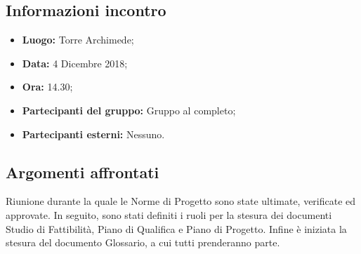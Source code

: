 \subsection{Informazioni incontro}
\begin{itemize}
	\item { \textbf{Luogo:} Torre Archimede;  }
	\item { \textbf{Data:} 4 Dicembre 2018; }
	\item { \textbf{Ora:} 14.30; }
	\item { \textbf{Partecipanti del gruppo:} Gruppo al completo; }
	\item { \textbf{Partecipanti esterni:} Nessuno. }
\end{itemize}


\subsection{Argomenti affrontati}
Riunione durante la quale le Norme di Progetto sono state ultimate, verificate ed approvate. In seguito, sono stati definiti i ruoli per la stesura dei documenti Studio di Fattibilità, Piano di Qualifica e Piano di Progetto. Infine è iniziata la stesura del documento Glossario, a cui tutti prenderanno parte.

